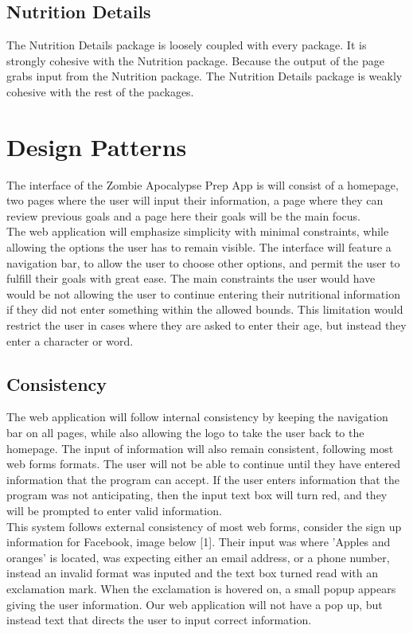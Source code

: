 \documentclass[a4paper]{article}
\begin{document}
\subsection{Nutrition Details}
The Nutrition Details package is loosely coupled with every package. It is strongly cohesive with the Nutrition package. Because the output of the page grabs input from the Nutrition package. The Nutrition Details package is weakly cohesive with the rest of the packages.

\section{Design Patterns}
The interface of the Zombie Apocalypse Prep App is will consist of a homepage, two pages where the user will input their information, a page where they can review previous goals and a page here their goals will be the main focus. \\

\noindent The web application will emphasize simplicity with minimal constraints, while allowing the options the user has to remain visible. The interface will feature a navigation bar, to allow the user to choose other options, and permit the user to fulfill their goals with great ease. The main constraints the user would have would be not allowing the user to continue entering their nutritional information if they did not enter something within the allowed bounds. This limitation would restrict the user in cases where they are asked to enter their age, but instead they enter a character or word. 
\newline
\newline
\subsection{Consistency}
The web application will follow internal consistency by keeping the navigation bar on all pages, while also allowing the logo to take the user back to the homepage. The input of information will also remain consistent, following most web forms formats. The user will not be able to continue until they have entered information that the program can accept. If the user enters information that the program was not anticipating, then the input text box will turn red, and they will be prompted to enter valid information.\\

\noindent This system follows external consistency of most web forms, consider the sign up information for Facebook, image below [1]. Their input was where 'Apples and oranges' is located, was expecting either an email address, or a phone number, instead an invalid format was inputed and the text box turned read with an exclamation mark. When the exclamation is hovered on, a small popup appears giving the user information. Our web application will not have a pop up, but instead text that directs the user to input correct information.\\
\end{document}
